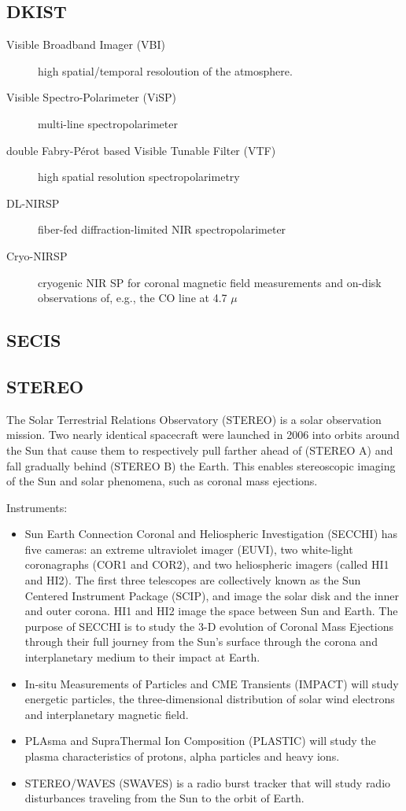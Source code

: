\documentclass{article}
\begin{document}
\subsection{DKIST}
\begin{description}
    \item [Visible Broadband Imager (VBI)] high spatial/temporal resoloution
        of the atmosphere.
    \item [Visible Spectro-Polarimeter (ViSP)] multi-line spectropolarimeter
    \item [double Fabry-P\'erot based Visible Tunable Filter (VTF)] high spatial
        resolution spectropolarimetry
    \item [DL-NIRSP] fiber-fed diffraction-limited NIR spectropolarimeter
    \item [Cryo-NIRSP] cryogenic NIR SP for coronal magnetic field measurements
        and on-disk observations of, e.g., the CO line at 4.7 ${\mu}$
\end{description}
\subsection{SECIS}
\subsection{STEREO}
The Solar Terrestrial Relations Observatory (STEREO) is a solar observation
mission. Two nearly identical spacecraft were launched in 2006 into
orbits around the Sun that cause them to respectively pull farther ahead
of (STEREO A)
and fall gradually behind (STEREO B) the Earth. This enables stereoscopic
imaging of the Sun and solar phenomena, such as coronal mass ejections.

Instruments:
\begin{itemize}
    \item Sun Earth Connection Coronal and Heliospheric Investigation
        (SECCHI) has five cameras: an extreme ultraviolet imager (EUVI),
        two white-light coronagraphs (COR1 and COR2), and two heliospheric
        imagers (called HI1 and HI2).  The first three telescopes are
        collectively known as the Sun Centered Instrument Package (SCIP),
        and image the solar disk and the inner and outer corona.  HI1 and
        HI2 image the space between Sun and Earth. The purpose of SECCHI is
        to study the 3-D evolution of Coronal Mass Ejections through their
        full journey from the Sun's surface through the corona and
        interplanetary medium to their impact at Earth.
    \item In-situ Measurements of Particles and CME Transients (IMPACT) will
        study energetic particles, the three-dimensional distribution of
        solar wind electrons and interplanetary magnetic field.
    \item PLAsma and SupraThermal Ion Composition (PLASTIC) will study the
        plasma characteristics of protons, alpha particles and heavy
        ions.
    \item STEREO/WAVES (SWAVES) is a radio burst tracker that will study
        radio disturbances traveling from the Sun to the orbit of
        Earth.
\end{itemize}
\end{document}
